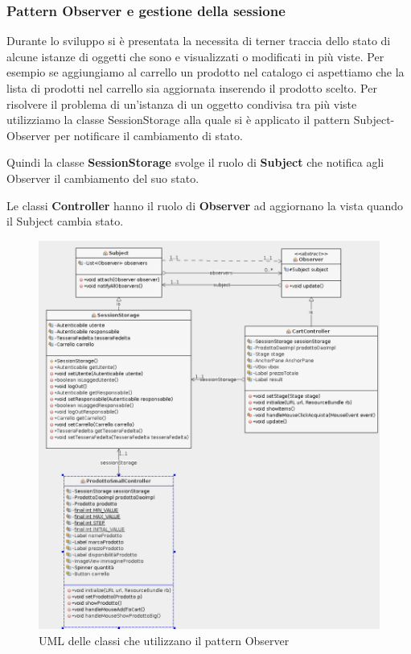 \documentclass{article}
\begin{document}
\subsubsection{Pattern Observer e gestione della sessione}
Durante lo sviluppo si è presentata la necessita di terner traccia dello stato di alcune istanze di oggetti che
sono e visualizzati o modificati in più viste.
Per esempio se aggiungiamo al carrello un prodotto nel catalogo ci aspettiamo che la lista di prodotti nel
carrello sia aggiornata inserendo il prodotto scelto.
Per risolvere il problema di un'istanza di un oggetto condivisa tra più viste utilizziamo la classe SessionStorage
alla quale si è applicato il pattern Subject-Observer per notificare il cambiamento di stato.


\noindent Quindi la classe \textbf{SessionStorage} svolge il ruolo di \textbf{Subject} che notifica agli
Observer il cambiamento del suo stato.


\noindent Le classi \textbf{Controller} hanno il ruolo di \textbf{Observer} ad aggiornano la vista quando
il Subject cambia stato.

\begin{figure}[h!]
	\centering
	\includegraphics[width=\textwidth]{UmlObserver.png}
	\caption{UML delle classi che utilizzano il pattern Observer}
	\label{fig:UmlProdotto}
\end{figure}
\clearpage
\newpage
\end{document}
